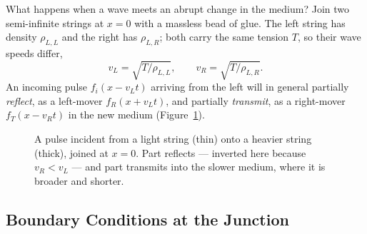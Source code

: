 What happens when a wave meets an abrupt change in the medium? Join two semi-infinite strings at $x=0$ with a massless bead of glue. The left string has density $\rho_{L,L}$ and the right has $\rho_{L,R}$; both carry the same tension $T$, so their wave speeds differ,
\begin{equation}
    v_L = \sqrt{T/\rho_{L,L}}, \qquad v_R = \sqrt{T/\rho_{L,R}}.
\end{equation}
An incoming pulse $f_i(x - v_L t)$ arriving from the left will in general partially \emph{reflect}, as a left-mover $f_R(x + v_L t)$, and partially \emph{transmit}, as a right-mover $f_T(x - v_R t)$ in the new medium (Figure~\ref{fig:reftrans}).

\begin{figure}[ht]
\centering
{}
\caption{A pulse incident from a light string (thin) onto a heavier string (thick), joined at $x=0$. Part reflects --- inverted here because $v_R < v_L$ --- and part transmits into the slower medium, where it is broader and shorter.}
\label{fig:reftrans}
\end{figure}

\subsection{Boundary Conditions at the Junction}

